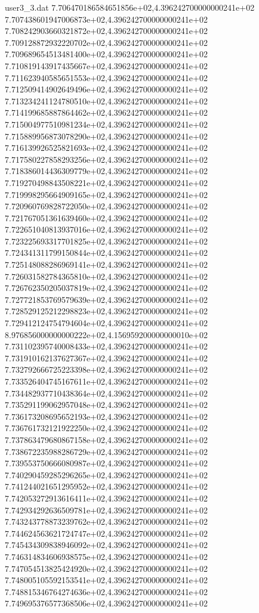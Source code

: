 \begin{filecontents}{user3_3.dat}
7.706470186584651856e+02,4.396242700000000241e+02
7.707438601947006873e+02,4.396242700000000241e+02
7.708242903660321872e+02,4.396242700000000241e+02
7.709128872932220702e+02,4.396242700000000241e+02
7.709689654513481400e+02,4.396242700000000241e+02
7.710819143917435667e+02,4.396242700000000241e+02
7.711623940585651553e+02,4.396242700000000241e+02
7.712509414902649496e+02,4.396242700000000241e+02
7.713234241124780510e+02,4.396242700000000241e+02
7.714199685887864462e+02,4.396242700000000241e+02
7.715004977510981234e+02,4.396242700000000241e+02
7.715889956873078290e+02,4.396242700000000241e+02
7.716139926525821693e+02,4.396242700000000241e+02
7.717580227858293256e+02,4.396242700000000241e+02
7.718386014436309779e+02,4.396242700000000241e+02
7.719270498843508221e+02,4.396242700000000241e+02
7.719998295664909165e+02,4.396242700000000241e+02
7.720960769828722050e+02,4.396242700000000241e+02
7.721767051361639460e+02,4.396242700000000241e+02
7.722651040813937016e+02,4.396242700000000241e+02
7.723225693317701825e+02,4.396242700000000241e+02
7.724341311799150844e+02,4.396242700000000241e+02
7.725148088286969141e+02,4.396242700000000241e+02
7.726031582784365810e+02,4.396242700000000241e+02
7.726762350205037819e+02,4.396242700000000241e+02
7.727721853769579639e+02,4.396242700000000241e+02
7.728529125212298823e+02,4.396242700000000241e+02
7.729412124754794604e+02,4.396242700000000241e+02
8.976856000000000222e+02,4.156959200000000010e+02
7.731102395740008433e+02,4.396242700000000241e+02
7.731910162137627367e+02,4.396242700000000241e+02
7.732792666725223398e+02,4.396242700000000241e+02
7.733526404745167611e+02,4.396242700000000241e+02
7.734482937710438364e+02,4.396242700000000241e+02
7.735291199062957048e+02,4.396242700000000241e+02
7.736173208695652193e+02,4.396242700000000241e+02
7.736761732121922250e+02,4.396242700000000241e+02
7.737863479680867158e+02,4.396242700000000241e+02
7.738672235988286729e+02,4.396242700000000241e+02
7.739553750666080987e+02,4.396242700000000241e+02
7.740290459285296265e+02,4.396242700000000241e+02
7.741244021651295952e+02,4.396242700000000241e+02
7.742053272913616411e+02,4.396242700000000241e+02
7.742934292636509781e+02,4.396242700000000241e+02
7.743243778873239762e+02,4.396242700000000241e+02
7.744624563621724747e+02,4.396242700000000241e+02
7.745434309838946092e+02,4.396242700000000241e+02
7.746314834606938575e+02,4.396242700000000241e+02
7.747054513825424920e+02,4.396242700000000241e+02
7.748005105592153541e+02,4.396242700000000241e+02
7.748815346764274636e+02,4.396242700000000241e+02
7.749695376577368506e+02,4.396242700000000241e+02

\end{filecontents}
